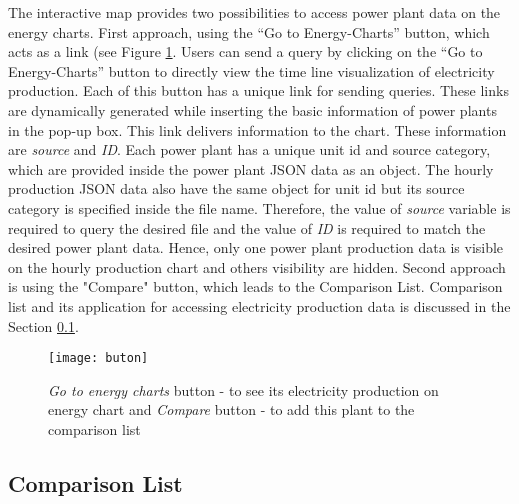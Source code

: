 The interactive map provides two possibilities to access power plant data on the energy charts. First approach, using the “Go to Energy-Charts” button, which acts as a link (see Figure \ref{fig:buttons}.  Users can send a query by clicking on the “Go to Energy-Charts” button to directly view the time line visualization of electricity production. Each of this button has a unique link for sending queries. These links are dynamically generated while inserting the basic information of power plants in the pop-up box. This link delivers information to the chart. These information are \textit{source} and \textit{ID}. Each power plant has a unique unit id and source category, which are provided inside the power plant JSON data as an object. The hourly production JSON data also have the same object for unit id but its source category is specified inside the file name. Therefore, the value of \textit{source} variable is required to query the desired file and the value of \textit{ID} is required to match the desired power plant data. Hence, only one power plant production data is visible on the hourly production chart and others visibility are hidden. Second approach is using the "Compare" button, which leads to the Comparison List. Comparison list and its application for accessing electricity production data is discussed in the Section \ref{sssec:comparisonList}.

\begin{figure}
\centering
\texttt{[image: buton]}
\caption[Buttons inside pop-up box]{\textit{Go to energy charts} button - to see its electricity production on energy chart and \textit{Compare} button - to add this plant to the comparison list}
\label{fig:buttons}
\end{figure}

\subsection{Comparison List}
\label{sssec:comparisonList}

